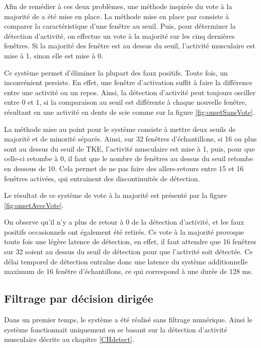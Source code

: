 \documentclass[letterpaper, twoside, 12pt, memoire, creativecommons, hyperref]{thETS}
\begin{document}
Afin de remédier à ces deux problèmes, une méthode inspirée du vote à la majorité de \cite{Chang1996} a été mise en place. La méthode mise en place par \cite{Chang1996} consiste à comparer la caractéristique d'une fenêtre au seuil. Puis, pour déterminer la détection d'activité, on effectue un vote à la majorité sur les cinq dernières fenêtres. Si la majorité des fenêtre est au dessus du seuil, l'activité musculaire est mise à 1, sinon elle est mise à 0.

Ce système permet d'éliminer la plupart des faux positifs. Toute fois, un inconvénient persiste. En effet, une fenêtre d'activation suffit à faire la différence entre une activité ou un repos. Ainsi, la détection d'activité peut toujours osciller entre 0 et 1, si la comparaison au seuil est différente à chaque nouvelle fenêtre, résultant en une activité en dents de scie comme sur la figure \ref{fig:onsetSansVote}.

La méthode mise au point pour le système consiste à mettre deux seuils de majorité et de minorité séparés. Ainsi, sur 32 fenêtres d'échantillons, si 16 ou plus sont au dessus du seuil de TKE, l'activité musculaire est mise à 1, puis, pour que celle-ci retombe à 0, il faut que le nombre de fenêtres au dessus du seuil retombe en dessous de 10. Cela permet de ne pas faire des allers-retours entre 15 et 16 fenêtres activées, qui entrainent des discontinuités de détection.

Le résultat de ce système de vote à la majorité est présenté par la figure \ref{fig:onsetAvecVote}.

On observe qu'il n'y a plus de retour à 0 de la détection d'activité, et les faux positifs occasionnels ont également été retirés. Ce vote à la majorité provoque toute fois une légère latence de détection, en effet, il faut attendre que 16 fenêtres sur 32 soient au dessus du seuil de détection pour que l'activité soit détectée. Ce délai temporel de détection entraîne donc une latence du système additionnelle maximum de 16 fenêtre d'échantillons, ce qui correspond à une durée de 128 ms. 

\subsection{Filtrage par décision dirigée}
\label{CHfiltrage}

Dans un premier temps, le système a été réalisé sans filtrage numérique. Ainsi le système fonctionnait uniquement en se basant sur la détection d'activité musculaire décrite au chapitre \ref{CHdetect}.
\end{document}

